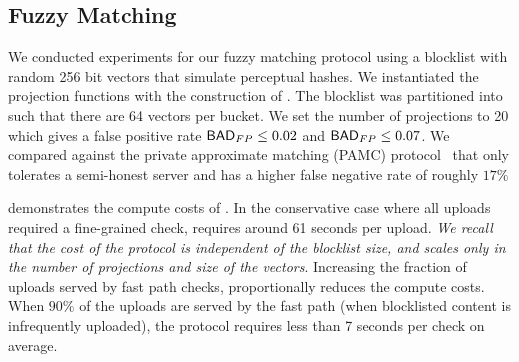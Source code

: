 \subsection{Fuzzy Matching}
%
We conducted experiments for our fuzzy matching protocol \protocolFM using a blocklist with random 256 bit vectors that simulate perceptual hashes. We instantiated the projection functions with the construction of \citet{chongchitmate2024approximate}. The blocklist was partitioned into \numBuckets such that there are 64 vectors per bucket. We set the number of projections to 20 which gives a false positive rate $\mathsf{BAD}_{FP} \le 0.02$ and $\mathsf{BAD}_{FP} \le 0.07$. We compared against the private approximate matching (PAMC) protocol~\cite{kulshrestha2021identifying} that only tolerates a semi-honest server and has a higher false negative rate of roughly $17\%$

%
 demonstrates the compute costs of \protocolFM. In the conservative case where all uploads required a fine-grained check, \protocolFM requires around 61 seconds per upload. \emph{We recall that the cost of the protocol is independent of the blocklist size, and scales only in the number of projections and size of the vectors}.  Increasing the fraction of uploads served by fast path checks, proportionally reduces the compute costs. When $90\%$ of the uploads are served by the fast path (when blocklisted content is infrequently uploaded), the protocol requires less than 7 seconds per check on average. 


%




